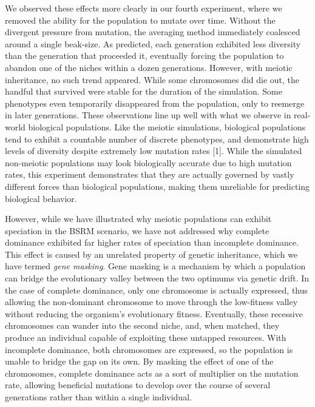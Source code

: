 \documentclass{article}
\begin{document}
We observed these effects more clearly in our fourth experiment, where we removed the ability for the population to mutate over time. Without the divergent pressure from mutation, the averaging method immediately coalesced around a single beak-size. As predicted, each generation exhibited less diversity than the generation that proceeded it, eventually forcing the population to abandon one of the niches within a dozen generations. However, with meiotic inheritance, no such trend appeared. While some chromosomes did die out, the handful that survived were stable for the duration of the simulation. Some phenotypes even temporarily disappeared from the population, only to reemerge in later generations. These observations line up well with what we observe in real-world biological populations. Like the meiotic simulations, biological populations tend to exhibit a countable number of discrete phenotypes, and demonstrate high levels of diversity despite extremely low mutation rates [1]. While the simulated non-meiotic populations may look biologically accurate due to high mutation rates, this experiment demonstrates that they are actually governed by vastly different forces than biological populations, making them unreliable for predicting biological behavior. 

However, while we have illustrated why meiotic populations can exhibit speciation in the BSRM scenario, we have not addressed why complete dominance exhibited far higher rates of speciation than incomplete dominance. This effect is caused by an unrelated property of genetic inheritance, which we have termed \textit{gene masking}. Gene masking is a mechanism by which a population can bridge the evolutionary valley between the two optimums via genetic drift. In the case of complete dominance, only one chromosome is actually expressed, thus allowing the non-dominant chromosome to move through the low-fitness valley without reducing the organism’s evolutionary fitness. Eventually, these recessive chromosomes can wander into the second niche, and, when matched, they produce an individual capable of exploiting these untapped resources. With incomplete dominance, both chromosomes are expressed, so the population is unable to bridge the gap on its own. By masking the effect of one of the chromosomes, complete dominance acts as a sort of multiplier on the mutation rate, allowing beneficial mutations to develop over the course of several generations rather than within a single individual.
\end{document}
